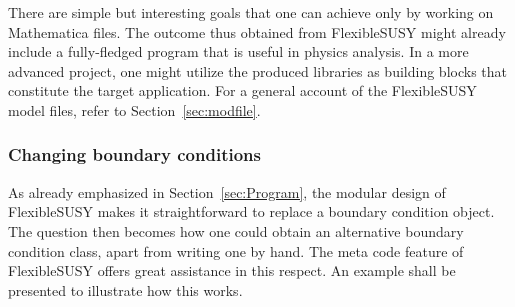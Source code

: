 \documentclass[final,3p,11pt,pdflatex]{elsarticle}
\makeatletter
\newcommand{\fs}{FlexibleSUSY\@\xspace}
\newcommand{\mathematica}{Mathematica\xspace}
\newcommand{\secref}[1]{Section~\ref{#1}}
\makeatother
\begin{document}
There are simple but interesting goals
that one can achieve only by working on
\mathematica files.
The outcome thus obtained from \fs
might already include a fully-fledged program
that is useful in physics analysis.
In a more advanced project,
one might utilize the produced libraries as building blocks
that constitute the target application.
For a general account of the \fs model files,
refer to \secref{sec:modfile}.

\subsubsection{Changing boundary conditions}
\label{sec:changing boundary conditions}

As already emphasized in \secref{sec:Program}, the modular design of
\fs makes it straightforward %
to replace a boundary condition object.
The question then becomes how
one could obtain an alternative boundary condition class,
apart from writing one by hand.
The meta code feature of \fs offers great assistance
in this respect.
An example shall be presented to illustrate how this works.
\end{document}
